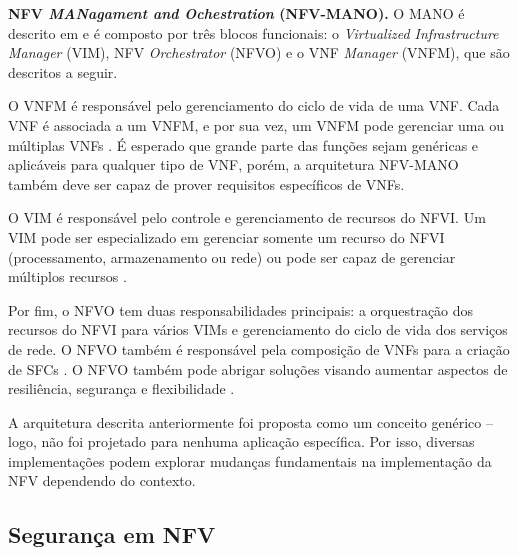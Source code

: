 \textbf{NFV \textit{MANagament and Ochestration} (NFV-MANO).} O MANO é descrito em \cite{etsi-manoarq} e é composto por três blocos funcionais: o \textit{Virtualized Infrastructure Manager} (VIM), NFV \textit{Orchestrator} (NFVO) e o VNF \textit{Manager} (VNFM), que são descritos a seguir.

O VNFM é responsável pelo gerenciamento do ciclo de vida de uma VNF. Cada VNF é associada a um VNFM, e por sua vez, um VNFM pode gerenciar uma ou múltiplas VNFs \cite[p~.25]{etsi-manoarq}. É esperado que grande parte das funções sejam genéricas e aplicáveis para qualquer tipo de VNF, porém, a arquitetura NFV-MANO também deve ser capaz de prover requisitos específicos de VNFs.

O VIM é responsável pelo controle e gerenciamento de recursos do NFVI. Um VIM pode ser especializado em gerenciar somente um recurso do NFVI (processamento, armazenamento ou rede) ou pode ser capaz de gerenciar múltiplos recursos \cite[p~.26]{etsi-manoarq}.

Por fim, o NFVO tem duas responsabilidades principais: a orquestração dos recursos do NFVI para vários VIMs e gerenciamento do ciclo de vida dos serviços de rede. O NFVO também é responsável pela composição de VNFs para a criação de SFCs \cite[p~.24]{etsi-manoarq}. O NFVO também pode abrigar soluções visando aumentar aspectos de resiliência, segurança e flexibilidade \cite{8350296} \cite{Varvarigou03072024}.

A arquitetura descrita anteriormente foi proposta como um conceito genérico -- logo, não foi projetado para nenhuma aplicação específica. Por isso, diversas implementações podem explorar mudanças fundamentais na implementação da NFV dependendo do contexto.




\subsection{Segurança em NFV}
\label{nfv:sec}

